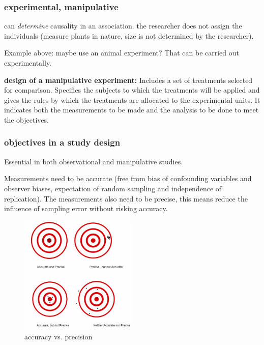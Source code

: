 \documentclass{article}
\begin{document}
\subsubsection{experimental, manipulative}
can \textit{determine} causality in an association. the researcher does not assign the individuals (measure plants in nature, size is not determined by the researcher).\par 
Example above: maybe use an animal experiment? That can be carried out experimentally.\par 
\noindent
\textbf{design of a manipulative experiment:} Includes a set of treatments selected for comparison. Specifies the subjects to which the treatments will be applied and gives the rules by which the treatments are allocated to the experimental units. It indicates both the measurements to be made and the analysis to be done to meet the objectives.\par 

\subsubsection{objectives in a study design}
Essential in both observational and manipulative studies.\par 
Measurements need to be accurate (free from bias of confounding variables and observer biases, expectation of random sampling and independence of replication). The measurements also need to be precise, this means reduce the influence of sampling error without risking accuracy.
\begin{figure}[h]
\centering
\includegraphics[width = 0.5\textwidth]{exp-design/accuratevsprecise.png}
\caption{accuracy vs. precision}
\end{figure}
\end{document}
